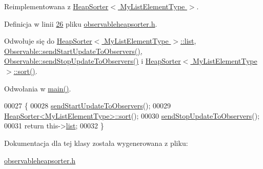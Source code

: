 Reimplementowana z \hyperlink{class_heap_sorter_a31220ba55d4478c50578c3a94dcbf26c}{Heap\-Sorter$<$ My\-List\-Element\-Type $>$}.



Definicja w linii \hyperlink{observableheapsorter_8h_source_l00026}{26} pliku \hyperlink{observableheapsorter_8h_source}{observableheapsorter.\-h}.



Odwołuje się do \hyperlink{heapsorter_8h_source_l00021}{Heap\-Sorter$<$ My\-List\-Element\-Type $>$\-::list}, \hyperlink{observable_8h_source_l00029}{Observable\-::send\-Start\-Update\-To\-Observers()}, \hyperlink{observable_8h_source_l00039}{Observable\-::send\-Stop\-Update\-To\-Observers()} i \hyperlink{heapsorter_8h_source_l00042}{Heap\-Sorter$<$ My\-List\-Element\-Type $>$\-::sort()}.



Odwołania w \hyperlink{main_8cpp_source_l00022}{main()}.


\begin{DoxyCode}
00027         \{
00028                 \hyperlink{class_observable_a78df64057f152342a43f27979186a6ba}{sendStartUpdateToObservers}();
00029                 \hyperlink{class_heap_sorter_a31220ba55d4478c50578c3a94dcbf26c}{HeapSorter<MyListElementType>::sort}();
00030                 \hyperlink{class_observable_a16f75ed1514a0cb7526b5a5d2b7ca7c6}{sendStopUpdateToObservers}();
00031                 \textcolor{keywordflow}{return} this->\hyperlink{class_heap_sorter_a6b8ac615ff2de0c2e510ad215d0508d9}{list};
00032         \}
\end{DoxyCode}


Dokumentacja dla tej klasy została wygenerowana z pliku\-:\begin{DoxyCompactItemize}
\item 
\hyperlink{observableheapsorter_8h}{observableheapsorter.\-h}\end{DoxyCompactItemize}
